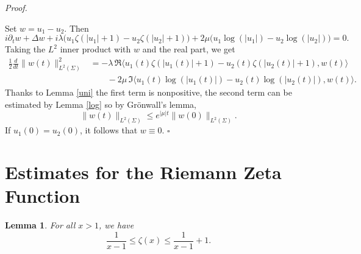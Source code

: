 \documentclass[10pt]{article}
\newtheorem{lemma}[theorem]{Lemma}
\renewenvironment{proof}[1][Proof]{%
  \noindent\textit{#1. }%
}{\hfill$\square$\vspace{4pt}}
\begin{document}
\begin{proof}
Set $w = u_1 - u_2$. Then
\[
i\partial_t w + \Delta w + i\lambda\big(u_1\zeta(|u_1|+1) - u_2\zeta(|u_2|+1)\big)
+ 2\mu\big(u_1\log(|u_1|) - u_2\log(|u_2|)\big) = 0.
\]
Taking the $L^2$ inner product with $w$ and the real part, we get
\begin{align*}
    \frac{1}{2}\frac{d}{dt}\|w(t)\|_{L^2(\Sigma)}^2
&= -\lambda\,\Re\langle u_1(t)\zeta(|u_1(t)|+1)-u_2(t)\zeta(|u_2(t)|+1), w(t)\rangle
    \\&\qquad -2\mu\,\Im\langle u_1(t)\log(|u_1(t)|)-u_2(t)\log(|u_2(t)|), w(t)\rangle.
\end{align*}
Thanks to Lemma \ref{uni} the first term is nonpositive, the second term can be estimated by Lemma \ref{log}
so by Grönwall’s lemma,
\[
\|w(t)\|_{L^2(\Sigma)} \le e^{|\mu| t} \|w(0)\|_{L^2(\Sigma)}.
\]
If $u_1(0)=u_2(0)$, it follows that $w\equiv 0$.
\end{proof}\\

\renewcommand{\appendixpagename}{Appendix}
\renewcommand{\appendixtocname}{Appendix}



\appendix
\appendixpage
\addappheadtotoc
\setcounter{theorem}{0}

\section{Estimates for the Riemann Zeta Function}\label{A}

\begin{lemma}
For all $x > 1$, we have
\[
\frac{1}{x - 1} \leq \zeta(x) \leq \frac{1}{x - 1} + 1.
\]
\end{lemma}
\end{document}
